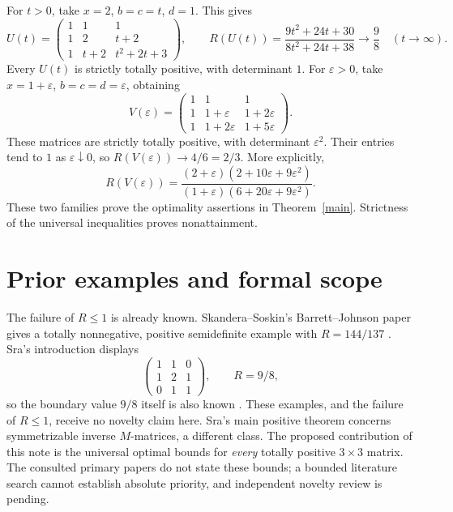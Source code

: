 \documentclass[11pt]{article}
\begin{document}
For $t>0$, take $x=2$, $b=c=t$, $d=1$. This gives
\[
 U(t)=\begin{pmatrix}1&1&1\\1&2&t+2\\1&t+2&t^2+2t+3\end{pmatrix},
 \qquad R(U(t))=\frac{9t^2+24t+30}{8t^2+24t+38}\longrightarrow\frac98
 \quad(t\longrightarrow\infty).
\]
Every $U(t)$ is strictly totally positive, with determinant $1$.
For $\varepsilon>0$, take $x=1+\varepsilon$, $b=c=d=\varepsilon$, obtaining
\[
 V(\varepsilon)=\begin{pmatrix}
 1&1&1\\1&1+\varepsilon&1+2\varepsilon\\
 1&1+2\varepsilon&1+5\varepsilon
 \end{pmatrix}.
\]
These matrices are strictly totally positive, with determinant
$\varepsilon^2$. Their entries tend to $1$ as $\varepsilon\downarrow0$,
so $R(V(\varepsilon))\to4/6=2/3$. More explicitly,
\[
 R(V(\varepsilon))=
 \frac{(2+\varepsilon)(2+10\varepsilon+9\varepsilon^2)}
 {(1+\varepsilon)(6+20\varepsilon+9\varepsilon^2)}.
\]
These two families prove the optimality assertions in Theorem~\ref{main}.
Strictness of the universal inequalities proves nonattainment.

\section{Prior examples and formal scope}
The failure of $R\le1$ is already known. Skandera--Soskin's
Barrett--Johnson paper gives a totally nonnegative, positive semidefinite
example with $R=144/137$ \cite[\S6]{SSBJ}. Sra's introduction displays
\[
 \begin{pmatrix}1&1&0\\1&2&1\\0&1&1\end{pmatrix},\qquad R=9/8,
\]
so the boundary value $9/8$ itself is also known \cite{Sra}.
These examples, and the failure of $R\le1$, receive no novelty claim here.
Sra's main positive theorem concerns symmetrizable inverse $M$-matrices,
a different class. The proposed contribution of this note is the universal
optimal bounds for \emph{every} totally positive $3\times3$ matrix.
The consulted primary papers do not state these bounds; a bounded
literature search cannot establish absolute priority, and independent
novelty review is pending.
\end{document}
